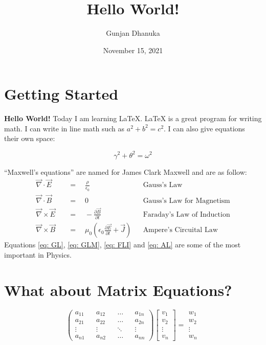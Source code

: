 \documentclass{article}
\title{Hello World!}
\author{Gunjan Dhanuka}
\date{November 15, 2021}
\begin{document}
    \maketitle %
    
    \section{Getting Started}
    
        \textbf{Hello World!} Today I am learning \LaTeX. \LaTeX{} is a great program
        for writing math. I can write in line math such as $a^2 + b^2 = c^2$. I can also give
        equations their own space:
        
        \begin{equation}
        \gamma^2+\theta^2=\omega^2
        \end{equation}

        ``Maxwell's equations'' are named for James Clark Maxwell and are as follow:
        \begin{align} %
            \vec{\nabla} \cdot \vec{E} \quad&=\quad\frac{\rho}{\epsilon_0}&&\text{Gauss's Law}\label{eq: GL}\\
            \vec{\nabla} \cdot \vec{B} \quad&=\quad0&&\text{Gauss's Law for Magnetism}\label{eq: GLM}\\
            \vec{\nabla} \times \vec{E} \quad&= \quad-\frac{\partial\vec{B}}{\partial t}&&\text{Faraday's Law of Induction}\label{eq: FLI}\\
            \vec{\nabla} \times \vec{B} \quad&=\quad \mu_0\left(\epsilon_0\frac{\partial\vec{E}}{\partial t}+\vec{J}\right)&&\text{Ampere's Circuital Law}\label{eq: AL}
        \end{align}
        Equations \ref{eq: GL}, \ref{eq: GLM}, \ref{eq: FLI} and \ref{eq: AL} are some of the most important in Physics.
    
    \section{What about Matrix Equations?}
        \begin{equation*}
            \begin{pmatrix}
                a_{11}&&a_{12}&&\dots&&a_{1n}\\
                a_{21}&&a_{22}&&\dots&&a_{2n}\\
                \vdots&&\vdots&&\ddots&&\vdots\\
                a_{n1}&&a_{n2}&&\dots&&a_{nn}
            \end{pmatrix}
            \begin{bmatrix}
                v_1\\v_2\\\vdots\\v_n
            \end{bmatrix}
            =
            \begin{matrix}
                w_1\\w_2\\\vdots\\w_n
            \end{matrix}
        \end{equation*}
\end{document}
